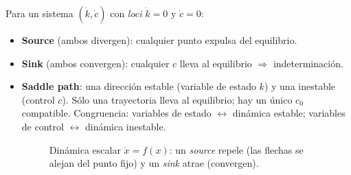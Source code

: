 \documentclass[11pt]{article}
\theoremstyle{definition}
\begin{document}
Para un sistema $(\dot{k},\dot{c})$ con \emph{loci} $\dot{k}=0$ y $\dot{c}=0$:
\begin{itemize}[leftmargin=1.4em]
\item \textbf{Source} (ambos divergen): cualquier punto expulsa del equilibrio.
\item \textbf{Sink} (ambos convergen): cualquier $c$ lleva al equilibrio $\Rightarrow$ indeterminación.
\item \textbf{Saddle path}: una dirección estable (variable de estado $k$) y una inestable (control $c$).
Sólo una trayectoria lleva al equilibrio; hay un único $c_{0}$ compatible. Congruencia: variables de
estado $\leftrightarrow$ dinámica estable; variables de control $\leftrightarrow$ dinámica inestable.

\begin{figure}[h]
\centering
{}
\caption{Dinámica escalar $\dot{x}=f(x)$: un \emph{source} repele (las flechas se alejan del punto
fijo) y un \emph{sink} atrae (convergen).}
\end{figure}


\end{itemize}
\end{document}

